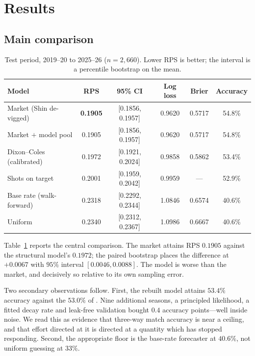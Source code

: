 \documentclass[11pt]{article}
\begin{document}
\section{Results}
\label{sec:results}

\subsection{Main comparison}

\begin{table}[t]
\centering
\caption{Test period, 2019--20 to 2025--26 ($n = 2{,}660$). Lower RPS is
better; the interval is a percentile bootstrap on the mean.}
\label{tab:main}
\small
\begin{tabular}{lccccc}
\toprule
Model & RPS & 95\% CI & Log loss & Brier & Accuracy \\
\midrule
Market (Shin de-vigged)     & \textbf{0.1905} & [0.1856, 0.1957] & 0.9620 & 0.5717 & 54.8\% \\
Market $+$ model pool       & 0.1905 & [0.1856, 0.1957] & 0.9620 & 0.5717 & 54.8\% \\
Dixon--Coles (calibrated)   & 0.1972 & [0.1921, 0.2024] & 0.9858 & 0.5862 & 53.4\% \\
Shots on target             & 0.2001 & [0.1959, 0.2042] & 0.9959 & ---    & 52.9\% \\
Base rate (walk-forward)    & 0.2318 & [0.2292, 0.2344] & 1.0846 & 0.6574 & 40.6\% \\
Uniform                     & 0.2340 & [0.2312, 0.2367] & 1.0986 & 0.6667 & 40.6\% \\
\bottomrule
\end{tabular}
\end{table}

Table~\ref{tab:main} reports the central comparison. The market attains RPS
$0.1905$ against the structural model's $0.1972$; the paired bootstrap places
the difference at $+0.0067$ with $95\%$ interval $[0.0046, 0.0088]$. The model
is worse than the market, and decisively so relative to its own sampling error.

Two secondary observations follow. First, the rebuilt model attains $53.4\%$
accuracy against the $53.0\%$ of \citet{pitcan2018}. Nine additional seasons, a
principled likelihood, a fitted decay rate and leak-free validation bought
$0.4$ accuracy points---well inside noise. We read this as evidence that
three-way match accuracy is near a ceiling, and that effort directed at it is
directed at a quantity which has stopped responding. Second, the appropriate
floor is the base-rate forecaster at $40.6\%$, not uniform guessing at $33\%$.
\end{document}
